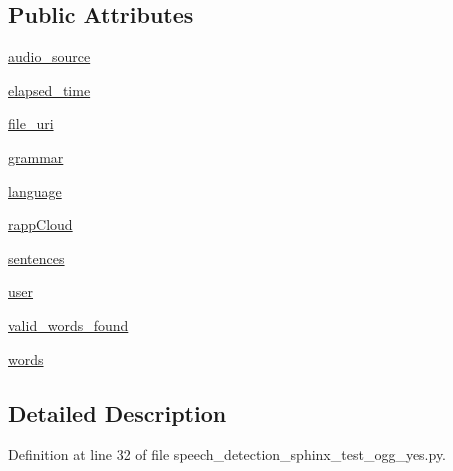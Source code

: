 \subsection*{Public Attributes}
\begin{DoxyCompactItemize}
\item 
\hyperlink{classspeech__detection__sphinx__test__ogg__yes_1_1RappInterfaceTest_a26b842a81bb7dcacdece3854cfe2df15}{audio\-\_\-source}
\item 
\hyperlink{classspeech__detection__sphinx__test__ogg__yes_1_1RappInterfaceTest_abe6d54c2afc9977193696591f44cbe35}{elapsed\-\_\-time}
\item 
\hyperlink{classspeech__detection__sphinx__test__ogg__yes_1_1RappInterfaceTest_a894edfd6bba80364efb2c1e1f068d449}{file\-\_\-uri}
\item 
\hyperlink{classspeech__detection__sphinx__test__ogg__yes_1_1RappInterfaceTest_a68c114f89ea2e5a6a4b4c93f1baa4215}{grammar}
\item 
\hyperlink{classspeech__detection__sphinx__test__ogg__yes_1_1RappInterfaceTest_ab59dda2740b751c915a555fce776dc50}{language}
\item 
\hyperlink{classspeech__detection__sphinx__test__ogg__yes_1_1RappInterfaceTest_aa314f8d03be98c4dcf75ae41bc76791f}{rapp\-Cloud}
\item 
\hyperlink{classspeech__detection__sphinx__test__ogg__yes_1_1RappInterfaceTest_a4b01325fe4e37b0ec1ac9ed69bcc819a}{sentences}
\item 
\hyperlink{classspeech__detection__sphinx__test__ogg__yes_1_1RappInterfaceTest_a84bff0e5fdaf8c8210bfaa4debe7fa73}{user}
\item 
\hyperlink{classspeech__detection__sphinx__test__ogg__yes_1_1RappInterfaceTest_a26665541d84685e574316fbdcd079d5c}{valid\-\_\-words\-\_\-found}
\item 
\hyperlink{classspeech__detection__sphinx__test__ogg__yes_1_1RappInterfaceTest_af8b46ae1a770a1bd5dac4121663e7345}{words}
\end{DoxyCompactItemize}


\subsection{Detailed Description}


Definition at line 32 of file speech\-\_\-detection\-\_\-sphinx\-\_\-test\-\_\-ogg\-\_\-yes.\-py.



